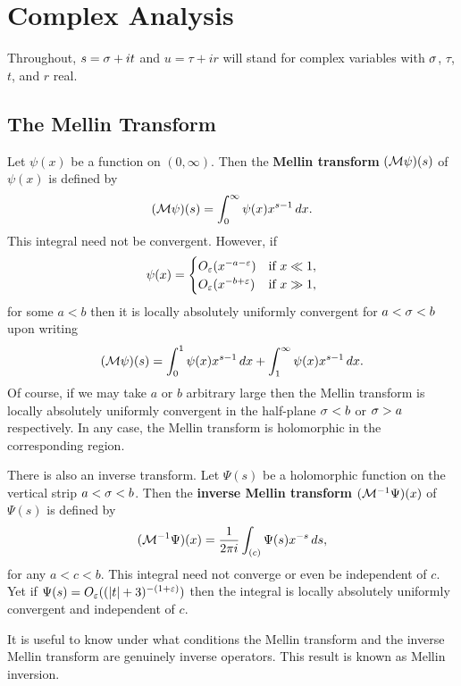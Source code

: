 \chapter{Complex Analysis}
  Throughout, \(s = \sigma+it\) and \(u = \tau+ir\) will stand for complex variables with \(\sigma\), \(\tau\), \(t\), and \(r\) real.
  \section{The Mellin Transform}\label{sec:The_Mellin_transform}
    Let \(\psi(x)\) be a function on \((0,\infty)\). Then the \textbf{Mellin transform} \((\mathcal{M}\psi)(s)\) of \(\psi(x)\) is defined by
    \[
      (\mathcal{M}\psi)(s) = \int_{0}^{\infty}\psi(x)x^{s-1}\,dx.
    \]
    This integral need not be convergent. However, if
    \[
      \psi(x) = \begin{cases} O_{\varepsilon}(x^{-a-\varepsilon}) & \text{if \(x \ll 1\)}, \\ O_{\varepsilon}(x^{-b+\varepsilon}) & \text{if \(x \gg 1\)}, \end{cases}
    \]
    for some \(a < b\) then it is locally absolutely uniformly convergent for \(a < \sigma < b\) upon writing
    \[
      (\mathcal{M}\psi)(s) = \int_{0}^{1}\psi(x)x^{s-1}\,dx+\int_{1}^{\infty}\psi(x)x^{s-1}\,dx.
    \]
    Of course, if we may take \(a\) or \(b\) arbitrary large then the Mellin transform is locally absolutely uniformly convergent in the half-plane \(\sigma < b\) or \(\sigma > a\) respectively. In any case, the Mellin transform is holomorphic in the corresponding region.

    There is also an inverse transform. Let \(\Psi(s)\) be a holomorphic function on the vertical strip \(a < \sigma < b\). Then the \textbf{inverse Mellin transform} \((\mathcal{M}^{-1}\Psi)(x)\) of \(\Psi(s)\) is defined by
    \[
      (\mathcal{M}^{-1}\Psi)(x) = \frac{1}{2\pi i}\int_{(c)}\Psi(s)x^{-s}\,ds,
    \]
    for any \(a < c < b\). This integral need not converge or even be independent of \(c\). Yet if \(\Psi(s) = O_{\varepsilon}((|t|+3)^{-(1+\varepsilon)})\) then the integral is locally absolutely uniformly convergent and independent of \(c\).

    It is useful to know under what conditions the Mellin transform and the inverse Mellin transform are genuinely inverse operators. This result is known as Mellin inversion.

